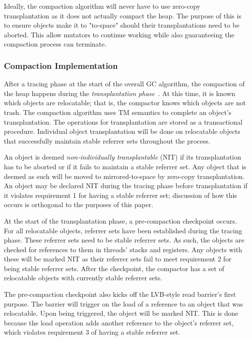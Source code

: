 \documentclass{sig-alternate}
\begin{document}
Ideally, the compaction algorithm will never have to use zero-copy transplantation
as it does not actually compact the heap. The purpose of this is to ensure
objects make it to "to-space" should their transplantations need to be aborted. 
This allow mutators to continue working while also guaranteeing the compaction 
process can terminate.


\subsubsection{Compaction Implementation}
\label{sec:collieAlgorithmImplementation}

After a tracing phase at the start of the overall GC algorithm, the compaction of
the heap happens during the \emph{transplantation phase}~\cite{Iyengar:Collie}.
At this time, it is known which objects are relocatable; that is, the compactor knows which 
objects are not trash. The compaction algorithm uses TM semantics to complete an object's
transplantation. The operations for transplantation are stored as a
transactional procedure. Individual object transplantation will be done on relocatable objects 
that successfully maintain stable referrer sets throughout the process.

An object is deemed \emph{non-individually transplantable} (NIT) if its transplantation
has to be aborted or if it fails to maintain a stable referrer set. 
Any object that is deemed as such will be moved to mirrored-to-space by zero-copy 
transplantation. An object may be declared NIT during the tracing phase before transplantation
if it violates requirement 1 for having a stable referrer set; discussion
of how this occurs is orthogonal to the purposes of this paper.

At the start of the transplantation phase, a pre-compaction checkpoint occurs.
For all relocatable objects, referrer sets have been established during the tracing phase.
These referrer sets need to be stable referrer sets. As such, the objects are checked for 
references to them in threads' stacks and registers. Any objects with these will be 
marked NIT as their referrer sets fail to meet requirement 2 for being stable referrer sets.
After the checkpoint, the compactor has a set of relocatable objects with currently stable referrer sets.

The pre-compaction checkpoint also kicks off the LVB-style read barrier's first purpose. 
The barrier will trigger on the load of a reference to an object that was 
relocatable. Upon being triggered, the object will be marked NIT. This is done because
the load operation adds another reference to the object's referrer set, which violates
requirement 3 of having a stable referrer set.
\end{document}
